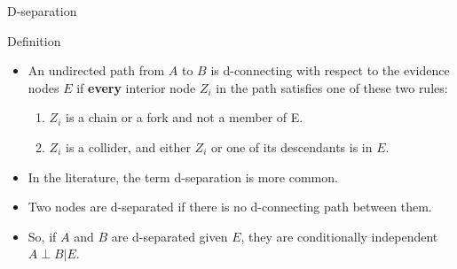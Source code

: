 \documentclass[handout]{beamer}
\begin{document}
\begin{frame}{D-separation}

\begin{block}{Definition}
 \begin{itemize}

\item An undirected path from $A$ to $B$ is d-connecting with respect to the evidence nodes $E$ if \textbf{every} interior node $Z_i$ in the path satisfies one of these two rules:

\begin{enumerate}
 \item $Z_i$ is a chain or a fork and not a member of E.
 \item $Z_i$ is a collider, and either $Z_i$ or one of its descendants is in $E$.
\end{enumerate}
 
 
\end{itemize}

\end{block}



\begin{itemize}


\item In the literature, the term d-separation is more common.

\item Two nodes are d-separated if there is no d-connecting path between them.


\item So, if $A$ and $B$ are d-separated given $E$, they are conditionally independent $A \perp B |E$. 

 
 
\end{itemize}





\end{frame}
\end{document}
